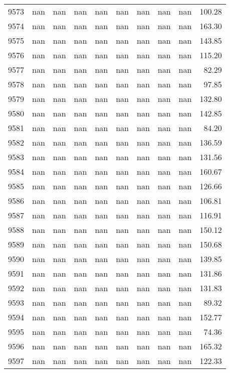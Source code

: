 \begin{tabular}{lrrrrrrrrr}
9573 & nan & nan & nan & nan & nan & nan & nan & nan & 100.28 \\
9574 & nan & nan & nan & nan & nan & nan & nan & nan & 163.30 \\
9575 & nan & nan & nan & nan & nan & nan & nan & nan & 143.85 \\
9576 & nan & nan & nan & nan & nan & nan & nan & nan & 115.20 \\
9577 & nan & nan & nan & nan & nan & nan & nan & nan & 82.29 \\
9578 & nan & nan & nan & nan & nan & nan & nan & nan & 97.85 \\
9579 & nan & nan & nan & nan & nan & nan & nan & nan & 132.80 \\
9580 & nan & nan & nan & nan & nan & nan & nan & nan & 142.85 \\
9581 & nan & nan & nan & nan & nan & nan & nan & nan & 84.20 \\
9582 & nan & nan & nan & nan & nan & nan & nan & nan & 136.59 \\
9583 & nan & nan & nan & nan & nan & nan & nan & nan & 131.56 \\
9584 & nan & nan & nan & nan & nan & nan & nan & nan & 160.67 \\
9585 & nan & nan & nan & nan & nan & nan & nan & nan & 126.66 \\
9586 & nan & nan & nan & nan & nan & nan & nan & nan & 106.81 \\
9587 & nan & nan & nan & nan & nan & nan & nan & nan & 116.91 \\
9588 & nan & nan & nan & nan & nan & nan & nan & nan & 150.12 \\
9589 & nan & nan & nan & nan & nan & nan & nan & nan & 150.68 \\
9590 & nan & nan & nan & nan & nan & nan & nan & nan & 139.85 \\
9591 & nan & nan & nan & nan & nan & nan & nan & nan & 131.86 \\
9592 & nan & nan & nan & nan & nan & nan & nan & nan & 131.83 \\
9593 & nan & nan & nan & nan & nan & nan & nan & nan & 89.32 \\
9594 & nan & nan & nan & nan & nan & nan & nan & nan & 152.77 \\
9595 & nan & nan & nan & nan & nan & nan & nan & nan & 74.36 \\
9596 & nan & nan & nan & nan & nan & nan & nan & nan & 165.32 \\
9597 & nan & nan & nan & nan & nan & nan & nan & nan & 122.33 \\

\end{tabular}
